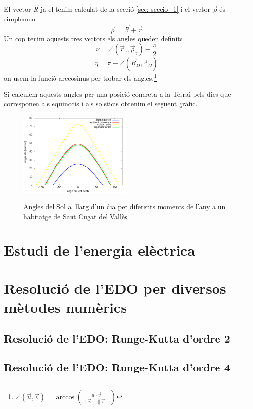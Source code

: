 \documentclass[11pt]{article}
\begin{document}
El vector $\vec{R}$ ja el tenim calculat de la secció \ref{sec: seccio_1} i el vector $\vec{\rho}$ és simplement
\begin{equation}
    \vec{\rho}= \vec{R}+\vec{r}
\end{equation}
Un cop tenim aquests tres vectors els angles queden definits
\begin{equation}
    \nu=\angle (\vec{r}_{\gamma}, \vec{\rho}_{\gamma}) -\frac{\pi}{2}  
\end{equation}
\begin{equation}
    \eta=\pi - \angle (\vec{R}_{\Omega}, \vec{r}_{\Omega})
\end{equation}
on usem la funció arccosinus per trobar els angles.\footnote{$\angle (\vec{u}, \vec{v})= \arccos\left(\frac{\vec{u} \cdot \vec{v}}{\|\vec{u}\| \|\vec{v}\|}\right)$}


Si calculem aquests angles per una posició concreta a la Terrai pels dies que corresponen als equinocis i als solsticis obtenim el següent gràfic.
\begin{figure}[h]
    \centering
    \includegraphics[width=0.5\textwidth]{equinocis.png}
    \label{solsticis}
    \caption{Angles del Sol al llarg d'un dia per diferents moments de l'any a un habitatge de Sant Cugat del Vallès}
\end{figure}

\section{Estudi de l'energia elèctrica}

\section{Resolució de l'EDO per diversos mètodes numèrics}\label{sec: edos}

\subsection{Resolució de l'EDO: Runge-Kutta d'ordre 2}

\subsection{Resolució de l'EDO: Runge-Kutta d'ordre 4}
\end{document}
